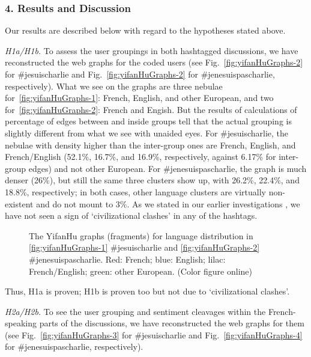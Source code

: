 \subsubsection{4. Results and Discussion}

Our results are described below with regard to the hypotheses stated above.

\textit{H1a/H1b.} To assess the user groupings in both hashtagged discussions, we have reconstructed the web graphs for the coded users (see Fig.~\cref{fig:yifanHuGraphs-2} for \#jesuischarlie and Fig.~\cref{fig:yifanHuGraphs-2} for \#jenesuispascharlie, respectively). What we see on the graphs are three nebulae for~\cref{fig:yifanHuGraphs-1}: French, English, and other European, and two for~\cref{fig:yifanHuGraphs-2}: French and Engish. But the results of calculations of percentage of edges between and inside groups tell that the actual grouping is slightly different from what we see with unaided eyes. For \#jesuischarlie, the nebulae with density higher than the inter-group ones are French, English, and French/English (52.1\%, 16.7\%, and 16.9\%, respectively, against 6.17\% for inter-group edges) and not other European. For \#jenesuispascharlie, the graph is much denser (26\%), but still the same three clusters show up, with 26.2\%, 22.4\%, and 18.8\%, respectively; in both cases, other language clusters are virtually non-existent and do not mount to 3\%. As we stated in our earlier investigations \cite{Authors2018}, we have not seen a sign of ‘civilizational clashes’ in any of the hashtags.

\begin{figure}[ht]
	\caption{The YifanHu graphs (fragments) for language distribution in \cref{fig:yifanHuGraphs-1} \#jesuischarlie and \cref{fig:yifanHuGraphs-2} \#jenesuispascharlie. Red: French; blue: English; lilac: French/English; green: other European. (Color figure online)}\label{fig:yifanHuGraphs-12}
\end{figure}

Thus, H1a is proven; H1b is proven too but not due to ‘civilizational clashes’.

\textit{H2a/H2b.} To see the user grouping and sentiment cleavages within the French-speaking parts of the discussions, we have reconstructed the web graphs for them (see Fig.~\cref{fig:yifanHuGraphs-3} for \#jesuischarlie and Fig.~\cref{fig:yifanHuGraphs-4} for \#jenesuispascharlie, respectively).

